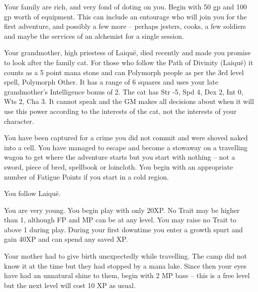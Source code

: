 \begin{multicols}{2}
\begin{list}{\addtocounter{list}{1}\textbf{:}}{\raggedleft}
	\item
	Your family are rich, and very fond of doting on you.
	Begin with 50 gp and 100 gp worth of equipment.
	This can include an entourage who will join you for the first adventure, and possibly a few more -- perhaps jesters, cooks, a few soldiers and maybe the services of an alchemist for a single session.

	\item
	Your grandmother, high priestess of Laiqu\"{e}, died recently and made you promise to look after the family cat.
	For those who follow the Path of Divinity (Laiqu\"{e}) it counts as a 5 point mana stone and can Polymorph people as per the 3rd level spell, Polymorph Other.
	It has a range of 6 squares and uses your late grandmother's Intelligence bonus of 2.
	The cat has Str -5, Spd 4, Dex 2, Int 0, Wts 2, Cha 3.
	It cannot speak and the GM makes all decisions about when it will use this power according to the interests of the cat, not the interests of your character.

	\item
	You have been captured for a crime you did not commit and were shoved naked into a cell.
	You have managed to escape and become a stowaway on a travelling wagon to get where the adventure starts but you start with nothing -- not a sword, piece of bred, spellbook or loincloth.
	You begin with an appropriate number of Fatigue Points if you start in a cold region.

	You follow Laiqu\"e.

	\item
	You are very young.
	You begin play with only 20XP.
	No Trait may be higher than 1, although FP and MP can be at any level.
	You may raise no Trait to above 1 during play.
	During your first downtime you enter a growth spurt and gain 40XP and can spend any saved XP.

	\item
	Your mother had to give birth unexpectedly while travelling.
	The camp did not know it at the time but they had stopped by a mana lake.
	Since then your eyes have had an unnatural shine to them, begin with 2 MP base -- this is a free level but the next level will cost 10 XP as usual.


\end{list}
\end{multicols}
